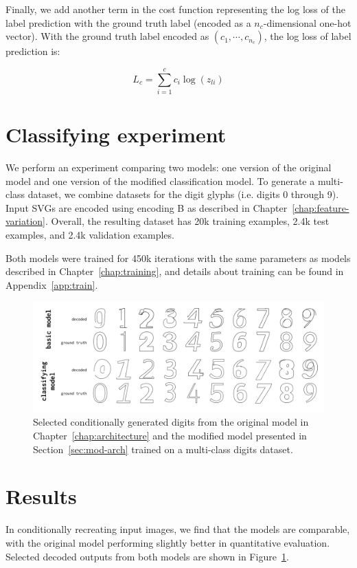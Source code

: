 Finally, we add another term in the cost function representing the log loss of the label prediction with the ground truth label (encoded as a $n_c$-dimensional one-hot vector).
With the ground truth label encoded as $(c_1, \cdots, c_{n_c})$, the log loss of label prediction is:

\begin{equation}
L_c = \sum_{i=1}^c c_i \log(z_{li})
\end{equation}

\section{Classifying experiment}
We perform an experiment comparing two models: one version of the original model and one version of the modified classification model.
To generate a multi-class dataset, we combine datasets for the digit glyphs (i.e. digits 0 through 9).
Input SVGs are encoded using encoding B as described in Chapter~\ref{chap:feature-variation}.
Overall, the resulting dataset has 20k training examples, 2.4k test examples, and 2.4k validation examples.

Both models were trained for 450k iterations with the same parameters as models described in Chapter~\ref{chap:training}, and details about training can be found in Appendix~\ref{app:train}.

\begin{figure}[h]
    \centering
	\includegraphics[width=\textwidth]{figures/digits}
    \caption[Visual results for the multi-class digits models]
    {Selected conditionally generated digits from the original model in Chapter~\ref{chap:architecture} and the modified model presented in Section~\ref{sec:mod-arch} trained on a multi-class digits dataset.\label{fig:class-results}}
\end{figure}

\section{Results}
In conditionally recreating input images, we find that the models are comparable, with the original model performing slightly better in quantitative evaluation. Selected decoded outputs from both models are shown in Figure~\ref{fig:class-results}.

